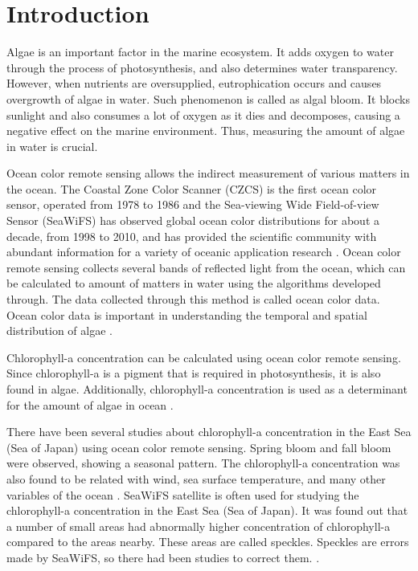 \section{Introduction}

Algae is an important factor in the marine ecosystem. It adds oxygen to water through the process of photosynthesis, and also determines water transparency. However, when nutrients are oversupplied, eutrophication occurs and causes overgrowth of algae in water. Such phenomenon is called as algal bloom. It blocks sunlight and also consumes a lot of oxygen as it dies and decomposes, causing a negative effect on the marine environment. Thus, measuring the amount of algae in water is crucial.

Ocean color remote sensing allows the indirect measurement of various matters in the ocean. The Coastal Zone Color Scanner (CZCS) is the first ocean color sensor, operated from 1978 to 1986 and the Sea-viewing Wide Field-of-view Sensor (SeaWiFS) has observed global ocean color distributions for about a decade, from 1998 to 2010, and has provided the scientific community with abundant information for a variety of oceanic application research \cite{kyung2013characteristics, hooker1992An}. Ocean color remote sensing collects several bands of reflected light from the ocean, which can be calculated to amount of matters in water using the algorithms developed through. The data collected through this method is called ocean color data. Ocean color data is important in understanding the temporal and spatial distribution of algae \cite{kimhc2016surface}.

Chlorophyll-a concentration can be calculated using ocean color remote sensing. Since chlorophyll-a is a pigment that is required in photosynthesis, it is also found in algae. Additionally, chlorophyll-a concentration is used as a determinant for the amount of algae in ocean \cite{o2000ocean}. 

There have been several studies about chlorophyll-a concentration in the East Sea (Sea of Japan) using ocean color remote sensing. Spring bloom and fall bloom were observed, showing a seasonal pattern. The chlorophyll-a concentration was also found to be related with wind, sea surface temperature, and many other variables of the ocean \cite{yamada2004seasonal}. SeaWiFS satellite is often used for studying the chlorophyll-a concentration in the East Sea (Sea of Japan). It was found out that a number of small areas had abnormally higher concentration of chlorophyll-a compared to the areas nearby. These areas are called speckles. Speckles are errors made by SeaWiFS, so there had been studies to correct them. \cite{chae2009characteristics}. 

